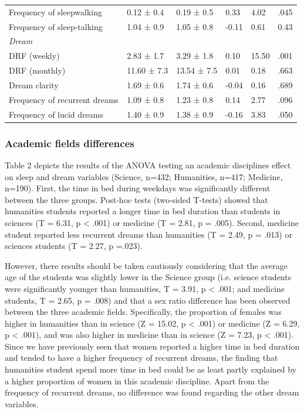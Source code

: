\begin{table}[!htb]
\begin{tabularx}{\textwidth}{lllXXX}
    Frequency of sleepwalking      & 0.12 ± 0.4                & 0.19 ± 0.5    & 0.33  & 4.02  & .045     \\
    Frequency of sleep-talking     & 1.04 ± 0.9                & 1.05 ± 0.8    & -0.11 & 0.61  & 0.43     \\
    \emph{Dream}                   &                           &               &       &       &          \\
    DRF (weekly)                   & 2.83 ± 1.7                & 3.29 ± 1.8    & 0.10  & 15.50 & .001     \\
    DRF (monthly)                  & 11.60 ± 7.3               & 13.54 ± 7.5   & 0.01  & 0.18  & .663     \\
    Dream clarity                  & 1.69 ± 0.6                & 1.74 ± 0.6    & -0.04 & 0.16  & .689     \\
    Frequency of recurrent dreams  & 1.09 ± 0.8                & 1.23 ± 0.8    & 0.14  & 2.77  & .096     \\
    Frequency of lucid dreams      & 1.40 ± 0.9                & 1.38 ± 0.9    & -0.16 & 3.83  & .050     \\ \bottomrule
    \end{tabularx}%
\end{table}

\subsubsection*{Academic fields differences}
Table 2 depicts the results of the ANOVA testing an academic disciplines effect on sleep and dream variables (Science, n=432; Humanities, n=417; Medicine, n=190). First, the time in bed during weekdays was significantly different between the three groups. Post-hoc tests (two-sided T-tests) showed that humanities students reported a longer time in bed duration than students in sciences (T = 6.31, p < .001) or medicine (T = 2.81, p = .005). Second, medicine student reported less recurrent dreams than humanities (T = 2.49, p = .013) or sciences students (T = 2.27, p =.023).

However, there results should be taken cautiously considering that the average age of the students was slightly lower in the Science group (i.e. science students were significantly younger than humanities, T = 3.91, p < .001; and medicine students, T = 2.65, p = .008) and that a sex ratio difference has been observed between the three academic fields. Specifically, the proportion of females was higher in humanities than in science (Z = 15.02, p < .001) or medicine (Z = 6.29, p < .001), and was also higher in medicine than in science (Z = 7.23, p < .001). Since we have previously seen that women reported a higher time in bed duration and tended to have a higher frequency of recurrent dreams, the finding that humanities student spend more time in bed could be as least partly explained by a higher proportion of women in this academic discipline. Apart from the frequency of recurrent dreams, no difference was found regarding the other dream variables.

